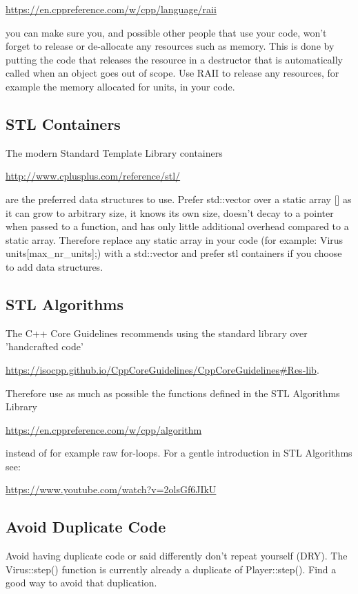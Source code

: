 \documentclass[12pt]{article}
\begin{document}
\url{https://en.cppreference.com/w/cpp/language/raii}

you can make sure you, and possible other people that use your code,
won't forget to release or de-allocate any resources such as
memory. This is done by putting the code that releases the resource in
a destructor that is automatically called when an object goes out of
scope. Use RAII to release any resources, for example the memory allocated
for units, in your code.

\subsection{STL Containers}
The modern Standard Template Library containers

\url{http://www.cplusplus.com/reference/stl/}

are the preferred data structures to use. Prefer std::vector over a
static array [] as it can grow to arbitrary size, it knows its own
size, doesn't decay to a pointer when passed to a function, and has
only little additional overhead compared to a static array. Therefore
replace any static array in your code (for example: Virus
units[max\_nr\_units];) with a std::vector and prefer stl containers
if you choose to add data structures.

\subsection{STL Algorithms}
The C++ Core Guidelines recommends using the standard library over
'handcrafted code'

\url{https://isocpp.github.io/CppCoreGuidelines/CppCoreGuidelines#Res-lib}.

Therefore use as much as possible the functions defined in the STL
Algorithms Library

\url{https://en.cppreference.com/w/cpp/algorithm}

instead of for example raw for-loops. For a gentle introduction in STL
Algorithms see:

\url{https://www.youtube.com/watch?v=2olsGf6JIkU}

\subsection{Avoid Duplicate Code}
Avoid having duplicate code or said differently don't repeat yourself
(DRY). The Virus::step() function is currently already a duplicate of
Player::step(). Find a good way to avoid that duplication.
\end{document}
